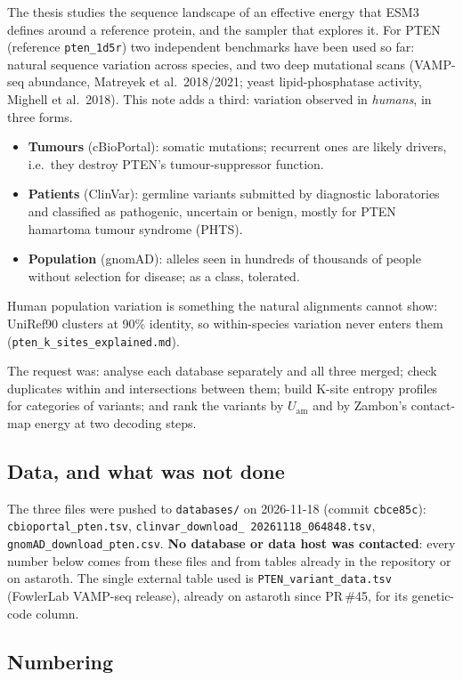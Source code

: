 \documentclass[11pt,a4paper]{article}
\newcommand{\file}[1]{\texttt{#1}}
\newcommand{\Uam}{U_{\mathrm{am}}}
\begin{document}
The thesis studies the sequence landscape of an effective energy that ESM3
defines around a reference protein, and the sampler that explores it. For PTEN
(reference \file{pten\_1d5r}) two independent benchmarks have been used so far:
natural sequence variation across species, and two deep mutational scans
(VAMP-seq abundance, Matreyek et al.\ 2018/2021; yeast lipid-phosphatase
activity, Mighell et al.\ 2018). This note adds a third: variation observed in
\emph{humans}, in three forms.
\begin{itemize}
\item \textbf{Tumours} (cBioPortal): somatic mutations; recurrent ones are
  likely drivers, i.e.\ they destroy PTEN's tumour-suppressor function.
\item \textbf{Patients} (ClinVar): germline variants submitted by diagnostic
  laboratories and classified as pathogenic, uncertain or benign, mostly for
  PTEN hamartoma tumour syndrome (PHTS).
\item \textbf{Population} (gnomAD): alleles seen in hundreds of thousands of
  people without selection for disease; as a class, tolerated.
\end{itemize}
Human population variation is something the natural alignments cannot show:
UniRef90 clusters at 90\% identity, so within-species variation never enters
them (\file{pten\_k\_sites\_explained.md}).

The request was: analyse each database separately and all three merged; check
duplicates within and intersections between them; build K-site entropy
profiles for categories of variants; and rank the variants by $\Uam$ and by
Zambon's contact-map energy at two decoding steps.

\subsection{Data, and what was not done}

The three files were pushed to \file{databases/} on 2026-11-18 (commit
\texttt{cbce85c}): \file{cbioportal\_pten.tsv}, \file{clinvar\_download\_%
20261118\_064848.tsv}, \file{gnomAD\_download\_pten.csv}. \textbf{No database
or data host was contacted}: every number below comes from these files and
from tables already in the repository or on astaroth. The single external
table used is \file{PTEN\_variant\_data.tsv} (FowlerLab VAMP-seq release),
already on astaroth since PR\,\#45, for its genetic-code column.

\subsection{Numbering}
\end{document}
